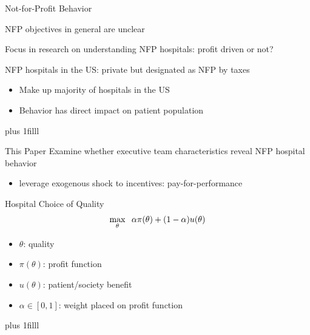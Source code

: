 \documentclass[notes,11pt, aspectratio=169]{beamer}
\newcommand{\btVFill}{\vskip0pt plus 1filll}
\newenvironment{wideitemize}{\itemize\addtolength{\itemsep}{10pt}}{\enditemize}
\begin{document}
\begin{frame}{Not-for-Profit Behavior}

    \vspace{12mm}
    NFP objectives in general are unclear

    \vspace{8mm}
    \begin{wideitemize}
        \item Focus in research on understanding NFP hospitals: profit driven or not?
        \item NFP hospitals in the US: private but designated as NFP by taxes
        \begin{itemize}
            \item Make up majority of hospitals in the US
            \item Behavior has direct impact on patient population
        \end{itemize}
    \end{wideitemize}

    \btVFill \pause

    \begin{block}{This Paper}
        Examine whether executive team characteristics reveal NFP hospital behavior
        \begin{itemize}
            \item leverage exogenous shock to incentives: pay-for-performance
        \end{itemize}
    \end{block}

\end{frame}

\begin{frame}{Hospital Choice of Quality}
\vspace{5mm}
$$\max_{\theta}\hspace{2mm}\alpha\pi(\theta) + (1-\alpha) u(\theta)$$
\begin{itemize}
        \item $\theta$: quality
        \item $\pi(\theta)$: profit function 
        \item $u(\theta)$: patient/society benefit
        \item $\alpha\in\left[0,1\right]$: weight placed on profit function 
    \end{itemize}
    \btVFill

\end{frame}
\end{document}
